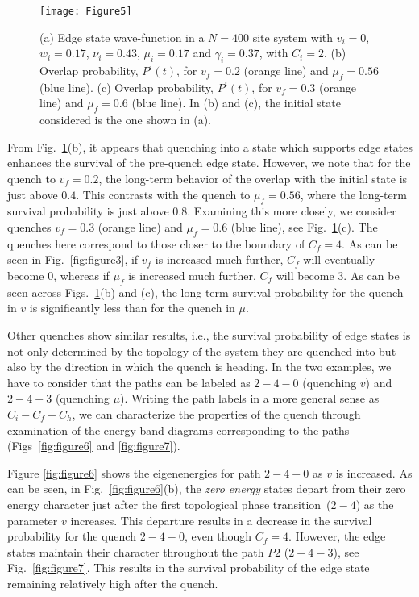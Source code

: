 \documentclass[aps,pra,reprint,superscriptaddress,longbibliography]{revtex4-2}
\begin{document}
  \begin{figure}
  	\centering
  	\texttt{[image: Figure5]}
  	\caption{ (a) Edge state wave-function in a $N=400$ site system with $v_i=0$, $w_i=0.17$, $\nu_i=0.43$, $\mu_i=0.17$ and $\gamma_i=0.37$, with $C_i=2$. (b) Overlap probability, $P^i(t)$, for $v_f=0.2$ (orange line) and $\mu_f=0.56$ (blue line). (c) Overlap probability, $P^i(t)$, for $v_f=0.3$ (orange line) and $\mu_f=0.6$ (blue line). In (b) and (c), the initial state considered is the one shown in (a).}
  	\label{fig:figure5}
	\vspace{-0.5cm}
  \end{figure}
  
    
From Fig.~\ref{fig:figure5}(b), it appears that quenching into a state which supports edge states enhances the survival of the pre-quench edge state. However, we note that for the quench to $v_f=0.2$, the long-term behavior of the overlap with the initial state is just above $0.4$. This contrasts with the quench to $\mu_f=0.56$, where the long-term survival probability is just above $0.8$. Examining this more closely, we consider quenches $v_f=0.3$ (orange line) and $\mu_f=0.6$ (blue line), see Fig.~\ref{fig:figure5}(c). The quenches here correspond to those closer to the boundary of $C_f=4$. As can be seen in Fig.~\ref{fig:figure3}, if $v_f$ is increased much further, $C_f$ will eventually become $0$, whereas if $\mu_f$ is increased much further, $C_f$ will become $3$. As can be seen across Figs.~\ref{fig:figure5}(b) and (c), the long-term survival probability for the quench in $v$ is significantly less than for the quench in $\mu$. 
    
Other quenches show similar results, i.e., the survival probability of edge states is not only determined by the topology of the system they are quenched into but also by the direction in which the quench is heading. In the two examples, we have to consider that the paths can be labeled as $2-4-0$ (quenching $v$) and $2-4-3$ (quenching $\mu$). Writing the path labels in a more general sense as $C_i-C_f-C_h$, we can characterize the properties of the quench through examination of the energy band diagrams corresponding to the paths (Figs~\ref{fig:figure6} and \ref{fig:figure7}).

Figure \ref{fig:figure6} shows the eigenenergies for path $2-4-0$ as $v$ is increased. As can be seen, in Fig.~\ref{fig:figure6}(b), the {\it zero energy} states depart from their zero energy character just after the first topological phase transition~($ 2-4 $) as the parameter $v$ increases. This departure results in a decrease in the survival probability for the quench $2-4-0$, even though $ C_f = 4 $. However, the edge states maintain their character throughout the path $P2$ ($2-4-3$), see Fig.~\ref{fig:figure7}. This results in the survival probability of the edge state remaining relatively high after the quench.  
\end{document}
